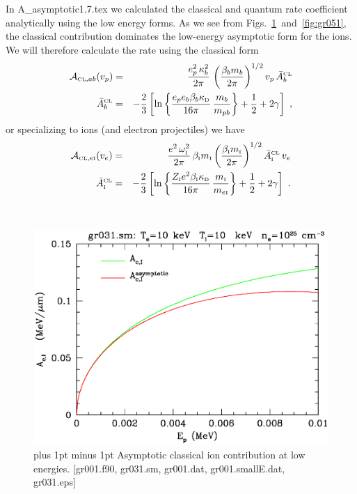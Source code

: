 \documentclass[preprint,12pt,eqsecnum,nofootinbib,amsmath,amssymb]{revtex4}
\newcommand{\smI}{{\rm\scriptscriptstyle I}}
\newcommand{\smD}{{\rm\scriptscriptstyle D}}
\newcommand{\smCL}{{\rm\scriptscriptstyle CL}}
\newcommand{\footnoteskip}{\baselineskip 12pt plus 1pt minus 1pt}
\begin{document}
In A\_asymptotic1.7.tex we calculated the classical and quantum rate
coefficient analytically using the low energy forms. As we see from
Figs.~\ref{fig:gr031}~and~\ref{fig:gr051}, the classical contribution
dominates the low-energy asymptotic form for the ions. We will
therefore calculate the rate using the classical form
\begin{eqnarray}
  {\cal A}_{\smCL,ab}(v_p)
  &=&
  \frac{e_p^2\,\kappa_b^2}{2\pi}\, 
  \left( \frac{\beta_b m_b}{2\pi}\right)^{1/2} v_p \,
  \bar A_b^\smCL
\\
  \bar A_b^\smCL
  &=&
  -\frac{2}{3}\left[\ln\left\{ \frac{e_p e_b \beta_b \kappa_\smD}{16\pi}\,
  \frac{m_b}{m_{pb}}\right\} + \frac{1}{2} + 2 \gamma
  \right] \ ,
\end{eqnarray}
or specializing to ions (and electron projectiles) we have
\begin{eqnarray}
  {\cal A}_{\smCL,e\smI}(v_e)
  &=&
  \frac{e^2\,\omega_\smI^2}{2\pi}\, \beta_\smI m_\smI
  \left( \frac{\beta_\smI m_\smI}{2\pi}\right)^{1/2} 
  \bar A_\smI^\smCL \, v_e
\\
  \bar A_\smI^\smCL
  &=&
  -\frac{2}{3}\left[\ln\left\{ \frac{Z_\smI e^2 \beta_\smI 
  \kappa_\smD}{16\pi}\,\frac{m_\smI}{m_{e\smI}}\right\} + 
  \frac{1}{2} + 2 \gamma \right] \ .
\end{eqnarray}

~

\vskip-2cm 
\begin{figure}[h!]
\includegraphics[scale=0.45]{gr031.eps} 
\vskip-0.8cm 
\caption{\footnoteskip  
  Asymptotic classical ion contribution at low energies. [gr001.f90,
  gr031.sm, gr001.dat, gr001.smallE.dat, gr031.eps]
}
\label{fig:gr031}
\end{figure}
\end{document}

